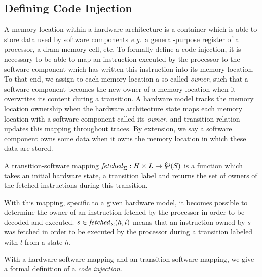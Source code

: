 \subsection{Defining Code Injection}
\label{subsec:speccert:tampering}

A memory location within a hardware architecture is a container which is able to
store data used by software components \emph{e.g.}~a general-purpose register of
a processor, a \ac{dram} memory cell, etc.
%
To formally define a code injection, it is necessary to be able to map an
instruction executed by the processor to the software component which has
written this instruction into its memory location.
%
To that end, we assign to each memory location a so-called \emph{owner}, such
that a software component becomes the new owner of a memory location when it
overwrites its content during a transition.
%
A hardware model tracks the memory location ownership when the hardware
architecture state maps each memory location with a software component called
its \emph{owner}, and transition relation updates this mapping throughout
traces.
%
By extension, we say a software component owns some data when it owns the memory
location in which these data are stored.

\begin{definition}
  \label{def:speccert:transsoft}
  A transition-software mapping
  $\func{fetched}_{\Sigma}: H \times L \rightarrow \powerset(S)$ is a function
  which takes an initial hardware state, a transition label and returns the set
  of owners of the fetched instructions during this transition.
\end{definition}

With this mapping, specific to a given hardware model, it becomes possible to
determine the owner of an instruction fetched by the processor in order to be
decoded and executed.
%
\( s \in \mathit{fetched}_{\Sigma}(h, l) \) means that an instruction owned by $s$
was fetched in order to be executed by the processor during a transition
labeled with \( l \) from a state \( h \).

With a hardware-software mapping and an transition-software mapping, we give a
formal definition of a \textit{code injection}.

%

